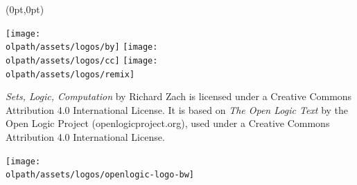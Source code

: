 \documentclass{memoir}
\newcommand{\olpath}{../../}
\newlength{\coverheight}
\newlength{\spinewidth}
\newlength{\spinepos} %
\begin{document}
\begin{textblock*}{\spinepos}(0pt,0pt)
  \noindent\hfil
  \begin{minipage}[b][\coverheight][b]{.8\spinepos}
\begin{minipage}[b]{.9cm}
\texttt{[image: \\olpath/assets/logos/by]}
\texttt{[image: \\olpath/assets/logos/cc]}
\texttt{[image: \\olpath/assets/logos/remix]}
\end{minipage}
\hspace{.3cm}
\begin{minipage}[b]{5cm}
\fontsize{8.5pt}{1em}\selectfont\textit{Sets, Logic, Computation}
by Richard Zach is licensed under a Creative Commons Attribution 4.0
International License. It is based on \textit{The Open Logic Text} by
the Open Logic Project (openlogicproject.org), used under a Creative
Commons Attribution 4.0 International License.
\end{minipage}
\hfill\color{black}
\texttt{[image: \\olpath/assets/logos/openlogic-logo-bw]}
\vspace*{1cm}
  \end{minipage}
  \hfil
  \end{textblock*}
\end{document}
